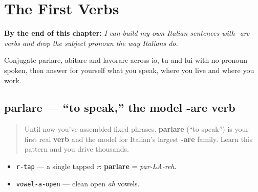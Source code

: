 
\chapter{The First Verbs}
\label{ch:it-first-verbs}

\begin{chapteropening}
\textbf{By the end of this chapter:} \emph{I can build my own Italian sentences with -are verbs and drop the subject pronoun the way Italians do.}

Conjugate parlare, abitare and lavorare across io, tu and lui with no pronoun spoken, then answer for yourself what you speak, where you live and where you work.
\end{chapteropening}

\section[parlare]{parlare — \textquotedblleft{}to speak,\textquotedblright{} the model -are verb}

\label{lesson:IT-C05-parlare}



\begin{quote}
Until now you've assembled fixed phrases. \textbf{parlare} (\textquotedblleft{}to speak\textquotedblright{}) is your first real \textbf{verb} and the model for Italian's largest \textbf{-are} family. Learn this pattern and you drive thousands.
\end{quote}

\begin{sounds}
\begin{itemize}
\raggedright
  \item \texttt{r-tap} — a single tapped \emph{r}: \textbf{parlare} = \emph{par-LA-reh}.
  \item \texttt{vowel-a-open} — clean open \emph{ah} vowels.
\end{itemize}
\end{sounds}

